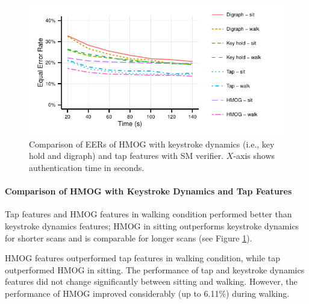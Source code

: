 \begin{figure}[t]
\includegraphics[width=1\linewidth]{plots_R/auth_compare_all_single.pdf}
\caption[]{Comparison of EERs of HMOG with keystroke dynamics (i.e., key hold and digraph) and tap features with SM verifier. $X$-axis shows authentication time in seconds.} %
\label{fig:walkVSsitAllSM}
\end{figure}

\paragraph{Comparison of HMOG with Keystroke Dynamics and Tap Features}
%
%
Tap features and HMOG features in walking condition performed better than keystroke dynamics features; HMOG in sitting outperforms keystroke dynamics for shorter scans and is comparable for longer scans (see Figure \ref{fig:walkVSsitAllSM}). 

HMOG features outperformed tap features in walking condition, while tap outperformed HMOG in sitting. 
The performance of tap and keystroke dynamics features did not change significantly between sitting and walking. However, the performance of HMOG improved considerably (up to 6.11\%) during walking. %

